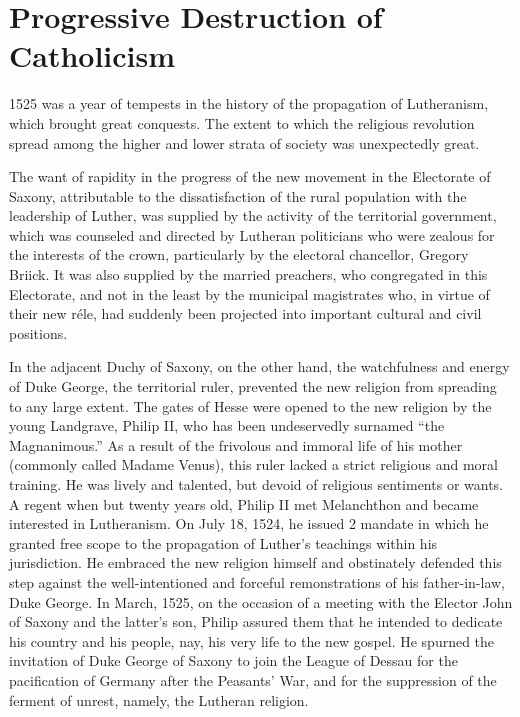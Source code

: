 \section{Progressive Destruction of Catholicism}

1525 was a year of tempests in the history of the propagation of
Lutheranism, which brought great conquests. The extent to which the
religious revolution spread among the higher and lower strata of
society was unexpectedly great.

The want of rapidity in the progress of the new movement in the
Electorate of Saxony, attributable to the dissatisfaction of the rural
population with the leadership of Luther, was supplied by the activity
of the territorial government, which was counseled and directed
by Lutheran politicians who were zealous for the interests of the
crown, particularly by the electoral chancellor, Gregory Briick. It
was also supplied by the married preachers, who congregated in this
Electorate, and not in the least by the municipal magistrates who,
in virtue of their new réle, had suddenly been projected into important
cultural and civil positions.

In the adjacent Duchy of Saxony, on the other hand, the watchfulness and
energy of Duke George, the territorial ruler, prevented the
new religion from spreading to any large extent.
The gates of Hesse were opened to the new religion by the young
Landgrave, Philip II, who has been undeservedly surnamed ``the
Magnanimous.'' As a result of the frivolous and immoral life of
his mother (commonly called Madame Venus), this ruler lacked
a strict religious and moral training. He was lively and talented,
but devoid of religious sentiments or wants. A regent when but
twenty years old, Philip II met Melanchthon and became interested
in Lutheranism. On July 18, 1524, he issued 2 mandate in which he
granted free scope to the propagation of Luther’s teachings within his
jurisdiction. He embraced the new religion himself and obstinately
defended this step against the well-intentioned and forceful remonstrations
of his father-in-law, Duke George. In March, 1525, on the
occasion of a meeting with the Elector John of Saxony and the latter’s
son, Philip assured them that he intended to dedicate his country and
his people, nay, his very life to the new gospel. He spurned the invitation
of Duke George of Saxony to join the League of Dessau for the
pacification of Germany after the Peasants’ War, and for the suppression
of the ferment of unrest, namely, the Lutheran religion.

